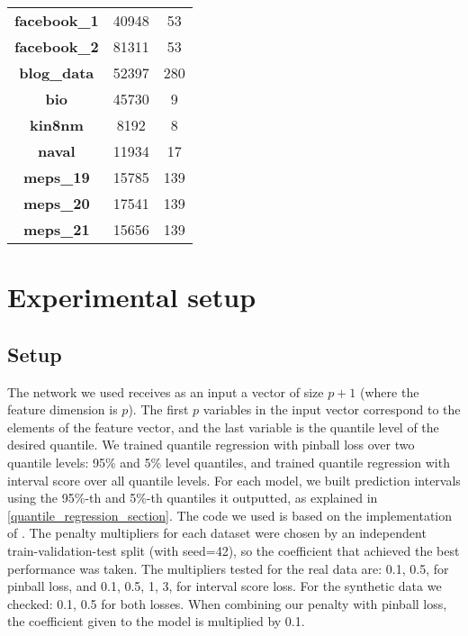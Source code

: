 \documentclass{article}
\begin{document}
\begin{appendices}
\begin{table}[htbp]
{\begin{tabular}{ccc}
    \textbf{facebook\_1} \cite{facebook_data} & 40948 & 53 \\

    \textbf{facebook\_2} \cite{facebook_data} & 81311 & 53 \\

    \textbf{blog\_data} \cite{blog_data} & 52397 & 280 \\

    \textbf{bio} \cite{bio_data} & 45730 & 9 \\

    \textbf{kin8nm} \cite{kin8nm_data} & 8192 & 8 \\

    \textbf{naval} \cite{naval_data} & 11934 & 17 \\

    \textbf{meps\_19} \cite{meps19_data} & 15785 & 139 \\

    \textbf{meps\_20} \cite{meps20_data}& 17541 & 139 \\

    \textbf{meps\_21} \cite{meps21_data} & 15656 & 139 \\
    
    \bottomrule[1.1pt]
    \end{tabular}%
}
\end{table}

\section{Experimental setup}\label{exp_settings}
\subsection{Setup}

The network we used receives as an input a vector of size $p+1$ (where the feature dimension is $p$). The first $p$ variables in the input vector correspond to the elements of the feature vector, and the last variable is the quantile level of the desired quantile. We trained quantile regression with pinball loss over two quantile levels: 95\% and 5\% level quantiles, and trained quantile regression with interval score over all quantile levels.
For each model, we built prediction intervals using the 95\%-th and 5\%-th quantiles it outputted, as explained in \ref{quantile_regression_section}.
The code we used is based on the implementation of \cite{beyond_pinball_loss}.
The penalty multipliers for each dataset were chosen by an independent train-validation-test split (with seed=42), so the coefficient that achieved the best performance was taken. The multipliers tested for the real data are: 0.1, 0.5, for pinball loss, and 0.1, 0.5, 1, 3, for interval score loss. For the synthetic data we checked: 0.1, 0.5 for both losses.
When combining our penalty with pinball loss, the coefficient given to the model is multiplied by 0.1.



\end{appendices}
\end{document}
